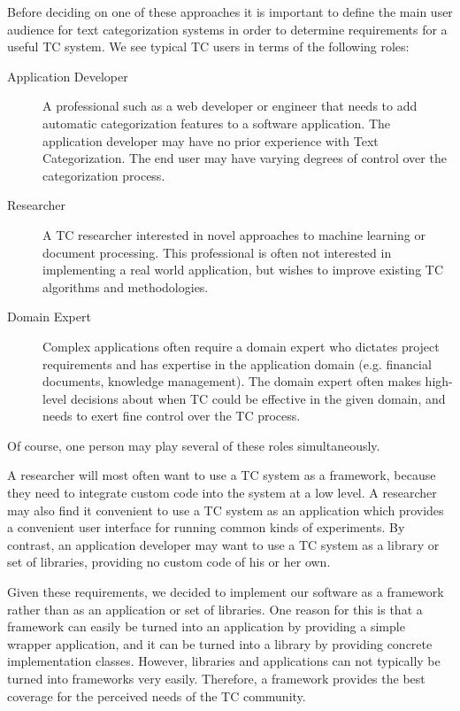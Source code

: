 \documentclass[twocolumn]{article}
\begin{document}
Before deciding on one of these approaches it is important to define
the main user audience for text categorization systems in order to determine
 requirements for a useful TC system.  We see typical TC users in terms of the following
roles:

\begin{description}
\item[Application Developer] A professional such as a web developer or
engineer that needs to add automatic categorization features to a
software application. The application developer may have no prior
experience with Text Categorization.  The end user may have varying
degrees of control over the categorization process.

\item[Researcher] A TC researcher interested in novel approaches to
machine learning or document processing.  This professional is often
not interested in implementing a real world application, but wishes to
improve existing TC algorithms and methodologies.

\item[Domain Expert] Complex applications often require a domain
expert who dictates project requirements and has expertise in the
application domain (e.g. financial documents, knowledge management).
The domain expert often makes high-level decisions about when TC could
be effective in the given domain, and needs to exert fine control over
the TC process.
\end{description}

Of course, one person may play several of these roles simultaneously.

A researcher will most often want to use a TC system as a framework,
because they need to integrate custom code into the system at a low
level.  A researcher may also find it convenient to use a TC system as
an application which provides a convenient user interface for running
common kinds of experiments.  By contrast, an application developer
may want to use a TC system as a library or set of libraries,
providing no custom code of his or her own.

Given these requirements, we decided to implement our software as a framework rather than as an application or set of libraries.  One reason for this is that a framework can easily be turned into an application by providing a simple wrapper application, and it can be turned into a library by providing concrete implementation classes.  However, libraries and applications can not typically be turned into frameworks very easily.  Therefore, a framework provides the best coverage for the perceived needs of the TC community.
\end{document}
